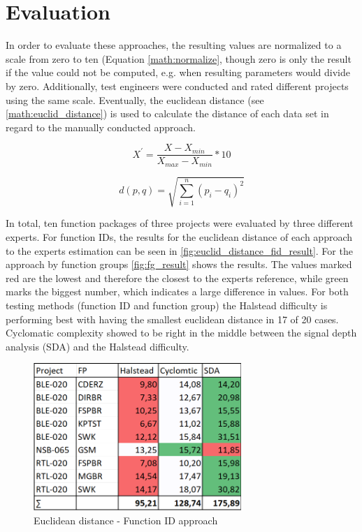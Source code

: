 \section{Evaluation}\label{sec:eval}

In order to evaluate these approaches, the resulting values are normalized to a scale from zero to ten (Equation \ref{math:normalize}, though zero is only the result if the value could not be computed, e.g. when resulting parameters would divide by zero. Additionally, test engineers were conducted and rated different projects using the same scale. Eventually, the euclidean distance (see \autoref{math:euclid_distance})  is used to calculate the distance of each data set in regard to the manually conducted approach.

\begin{equation}
\label{math:normalize}
X^{'} = \frac{X - X_{min}}{X_{max} - X_{min}} * 10
\end{equation}

\begin{equation} 
	\label{math:euclid_distance}
	d(p,q) = \sqrt{\displaystyle\sum_{i=1}^{n} (p_i - q_i)^2}
\end{equation}
	
In total, ten function packages of three projects were evaluated by three different experts. For function IDs, the results for the euclidean distance of each approach to the experts estimation can be seen in \autoref{fig:euclid_distance_fid_result}. For the approach by function groups \autoref{fig:fg_result} shows the results.
The values marked red are the lowest and therefore the closest to the experts reference, while green marks the biggest number, which indicates a large difference in values. For both testing methods (function ID and function group) the Halstead difficulty is performing best with having the smallest euclidean distance in 17 of 20 cases. Cyclomatic complexity showed to be right in the middle between the signal depth analysis (SDA) and the Halstead difficulty.

\begin{figure}[ht]
	\centering
	\includegraphics[width=0.7\textwidth]{graphic/FID_RESULT.png}
	\caption{Euclidean distance - Function ID approach} 
	\label{fig:euclid_distance_fid_result}
\end{figure}

